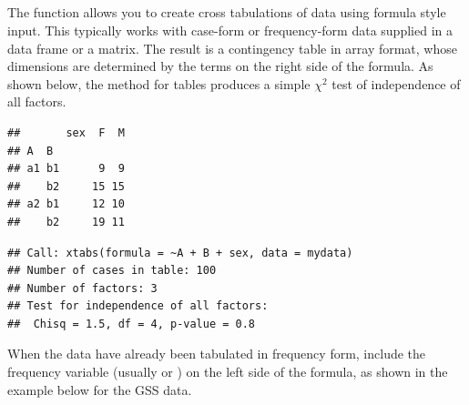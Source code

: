 \documentclass[11pt]{book}
\renewenvironment{knitrout}{\small\renewcommand{\baselinestretch}{.85}}{} %
\begin{document}
\subsection[xtabs()]{}\label{sec:xtabs}

The  function allows you to create cross tabulations of data using formula style input.
This typically works with case-form or frequency-form data
supplied in a data frame or a matrix.
The result is a contingency table in array format, whose dimensions are determined by the terms on the right side of the formula.  As shown below, the  method
for tables produces a simple $\chi^2$ test of independence of all factors.

\begin{knitrout}
\color{fgcolor}\begin{kframe}
\begin{alltt}
 \hlkwb{<-} \hlstd{(}\hlopt{~}\hlopt{+}\hlopt{+} 
    
\end{alltt}
\begin{verbatim}
##       sex  F  M
## A  B           
## a1 b1      9  9
##    b2     15 15
## a2 b1     12 10
##    b2     19 11
\end{verbatim}
\begin{alltt}
   
\end{alltt}
\begin{verbatim}
## Call: xtabs(formula = ~A + B + sex, data = mydata)
## Number of cases in table: 100 
## Number of factors: 3 
## Test for independence of all factors:
## 	Chisq = 1.5, df = 4, p-value = 0.8
\end{verbatim}
\end{kframe}
\end{knitrout}

When the data have already been tabulated in frequency form, include the
frequency variable (usually  or )
on the left side of the formula, as shown in the example below for the GSS data.
\end{document}
